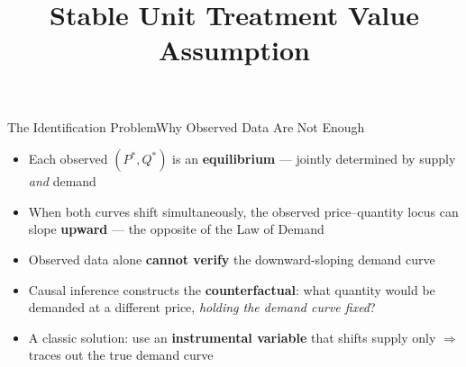 \documentclass[hyperref={pdfpagelabels=false}]{beamer}
\begin{document}
\begin{frame}{The Identification Problem}{Why Observed Data Are Not Enough}
	\begin{itemize}
		\item Each observed $(P^*, Q^*)$ is an \textbf{equilibrium} --- jointly determined by supply \emph{and} demand
		\vspace{0.3cm}
		\item When both curves shift simultaneously, the observed price--quantity locus can slope \textbf{upward} --- the opposite of the Law of Demand
		\vspace{0.3cm}
		\item Observed data alone \textbf{cannot verify} the downward-sloping demand curve
		\vspace{0.3cm}
		\item Causal inference constructs the \textbf{counterfactual}: what quantity would be demanded at a different price, \emph{holding the demand curve fixed}?
		\vspace{0.3cm}
		\item A classic solution: use an \textbf{instrumental variable} that shifts supply only $\Rightarrow$ traces out the true demand curve
	\end{itemize}
\end{frame}

\title[]  
{Stable Unit Treatment Value Assumption}


\author 
{}

\institute{}






\date
{}


\begin{frame}{}
	\titlepage
\end{frame}
\end{document}
